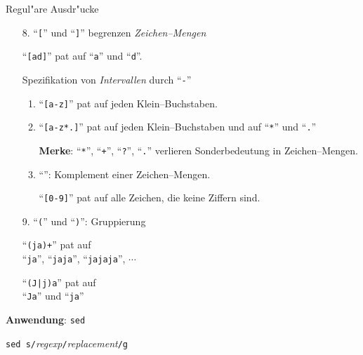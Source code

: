 
\begin{slide}{}
\normalsize
\begin{center}
Regul"are Ausdr"ucke
\end{center}

\footnotesize
\begin{enumerate}
\item[8.] ``\texttt{[}'' und ``\texttt{]}'' begrenzen \emph{Zeichen--Mengen}

     ``\texttt{[ad]}'' pa\3t auf ``\texttt{a}'' und ``\texttt{d}''.
     \vspace*{0.3cm}

     Spezifikation von \emph{Intervallen} durch   ``\texttt{-}''
           \begin{enumerate}
           \item ``\texttt{[a-z]}'' pa\3t auf jeden Klein--Buchstaben.
           \item ``\texttt{[a-z*.]}'' pa\3t auf jeden Klein--Buchstaben und auf
                 ``\texttt{*}'' und ``\texttt{.}''

                 \textbf{Merke}: ``\texttt{*}'',  ``\texttt{+}'',  ``\texttt{?}'', ``\texttt{.}''
                 verlieren Sonderbedeutung in Zeichen--Mengen.
           \item ``\texttt{}'': Komplement einer Zeichen--Mengen.

                  ``\texttt{[0-9]}'' pa\3t auf alle Zeichen, die keine
                 Ziffern sind.
           \end{enumerate}
\item[9.] ``\texttt{(}'' und ``\texttt{)}'': Gruppierung

      ``\texttt{(ja)+}'' pa\3t auf \\[0.1cm]
      \hspace*{1.3cm} ``\texttt{ja}'', ``\texttt{jaja}'', ``\texttt{jajaja}'', $\cdots$

      ``\texttt{(J|j)a}'' pa\3t auf \\[0.1cm]
      \hspace*{1.3cm} ``\texttt{Ja}'' und ``\texttt{ja}''
      
\end{enumerate}

\textbf{Anwendung}: \texttt{sed}

\texttt{sed s/}\textsl{regexp}\texttt{/}\textsl{replacement}\texttt{/g}
    

\end{slide}
